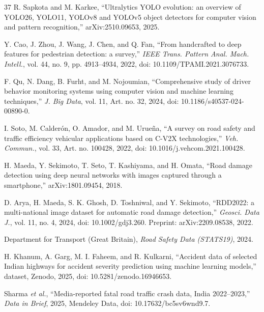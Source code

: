 \documentclass[journal]{IEEEtran}
\begin{document}
\begin{thebibliography}{37}
 R. Sapkota and M. Karkee, ``Ultralytics YOLO evolution: an overview of YOLO26, YOLO11, YOLOv8 and YOLOv5 object detectors for computer vision and pattern recognition,'' arXiv:2510.09653, 2025.

 Y. Cao, J. Zhou, J. Wang, J. Chen, and Q. Fan, ``From handcrafted to deep features for pedestrian detection: a survey,'' \emph{IEEE Trans. Pattern Anal. Mach. Intell.}, vol. 44, no. 9, pp. 4913--4934, 2022, doi: 10.1109/TPAMI.2021.3076733.

 F. Qu, N. Dang, B. Furht, and M. Nojoumian, ``Comprehensive study of driver behavior monitoring systems using computer vision and machine learning techniques,'' \emph{J. Big Data}, vol. 11, Art. no. 32, 2024, doi: 10.1186/s40537-024-00890-0.

 I. Soto, M. Calder\'on, O. Amador, and M. Urue\~na, ``A survey on road safety and traffic efficiency vehicular applications based on C-V2X technologies,'' \emph{Veh. Commun.}, vol. 33, Art. no. 100428, 2022, doi: 10.1016/j.vehcom.2021.100428.

 H. Maeda, Y. Sekimoto, T. Seto, T. Kashiyama, and H. Omata, ``Road damage detection using deep neural networks with images captured through a smartphone,'' arXiv:1801.09454, 2018.

 D. Arya, H. Maeda, S. K. Ghosh, D. Toshniwal, and Y. Sekimoto, ``RDD2022: a multi-national image dataset for automatic road damage detection,'' \emph{Geosci. Data J.}, vol. 11, no. 4, 2024, doi: 10.1002/gdj3.260. Preprint: arXiv:2209.08538, 2022.

 Department for Transport (Great Britain), \emph{Road Safety Data (STATS19)}, 2024.

 H. Khanum, A. Garg, M. I. Faheem, and R. Kulkarni, ``Accident data of selected Indian highways for accident severity prediction using machine learning models,'' dataset, Zenodo, 2025, doi: 10.5281/zenodo.16946653.

 Sharma \emph{et al.}, ``Media-reported fatal road traffic crash data, India 2022--2023,'' \emph{Data in Brief}, 2025, Mendeley Data, doi: 10.17632/bc5sv6wnd9.7.

\end{thebibliography}
\end{document}
